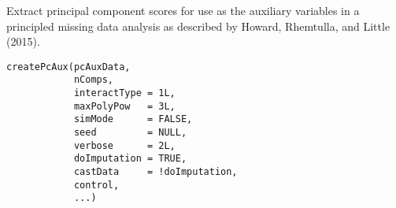 \documentclass[letterpaper]{book}
\begin{document}
%
\begin{Description}\relax
Extract principal component scores for use as the auxiliary variables
in a principled missing data analysis as described by Howard,
Rhemtulla, and Little (2015). 
\end{Description}
%
\begin{Usage}
\begin{verbatim}
createPcAux(pcAuxData,
            nComps,       
            interactType = 1L,
            maxPolyPow   = 3L,
            simMode      = FALSE,
            seed         = NULL,
            verbose      = 2L,
            doImputation = TRUE,
            castData     = !doImputation,
            control,
            ...)
\end{verbatim}
\end{Usage}
%
\end{document}
